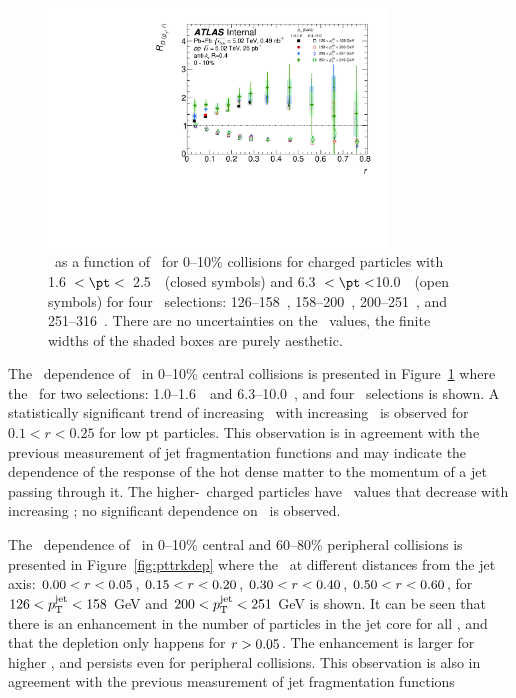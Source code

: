 \begin{figure}[ht]
\centerline{
\includegraphics[width=0.8\textwidth]{figures/results/RDpT_final_ratio_dR_CONF_data_trk2_6_cent0.pdf} 
}
\caption{\RDptr\ as a function of \rvar\ for 0--10\% collisions for charged particles with 1.6~$< \pt <$~2.5~\GeV\
(closed symbols) and 6.3~$< \pt <$10.0~\GeV\ (open symbols) for four \ptjet\ selections: 126--158~\GeV, 158--200~\GeV,
200--251~\GeV, and 251--316~\GeV. There are no uncertainties on the \rvar\ values, the finite widths of the shaded boxes are purely aesthetic.}
\label{fig:ptjetdep}
\end{figure}

The \ptjet\ dependence of \RDptr\ in 0--10\% central collisions is presented in Figure~\ref{fig:ptjetdep} where the \RDptr\ for two \pt selections: 1.0--1.6~\GeV\ and \mbox{6.3--10.0~\GeV}, and four \ptjet\ selections is shown. A statistically significant trend of increasing \RDptr\ with increasing \ptjet\ is observed for $0.1 < r < 0.25$ for low pt particles. This observation is in agreement with the previous measurement of jet fragmentation functions \cite{Chatrchyan:2014ava, Sirunyan:2018jqr, Aaboud:2017bzv, PhysRevC.98.024908} and may indicate the dependence of the response of the hot dense matter to the momentum of a jet passing through it. 
The higher-\pt\ charged particles have \RDptr\ values that decrease with increasing \rvar; no significant dependence on \ptjet\ is observed. 

The \pttrk\ dependence of \RDptr\ in 0--10\% central and 60--80\% peripheral collisions is presented in Figure~\ref{fig:pttrkdep} where the \RDptr\ at different distances from the jet axis: $0.00 < \mbox{$r$} < 0.05$, $0.15 < \mbox{$r$} < 0.20$, $0.30 < \mbox{$r$} < 0.40$, $0.50 < \mbox{$r$} < 0.60$, for $126 < \mbox{$p_{\mathrm{T}}^{\mathrm{jet}}$} < 158$ GeV and $200 < \mbox{$p_{\mathrm{T}}^{\mathrm{jet}}$} < 251$ GeV is shown. It can be seen that there is an enhancement in the number of particles in the jet core for all \pt, and that the depletion only happens for $\mbox{$r$} > 0.05$. The enhancement is larger for higher \ptjet, and persists even for peripheral collisions. This observation is also in agreement with the previous measurement of jet fragmentation functions \cite{Chatrchyan:2014ava, Sirunyan:2018jqr, Aaboud:2017bzv, PhysRevC.98.024908} 

